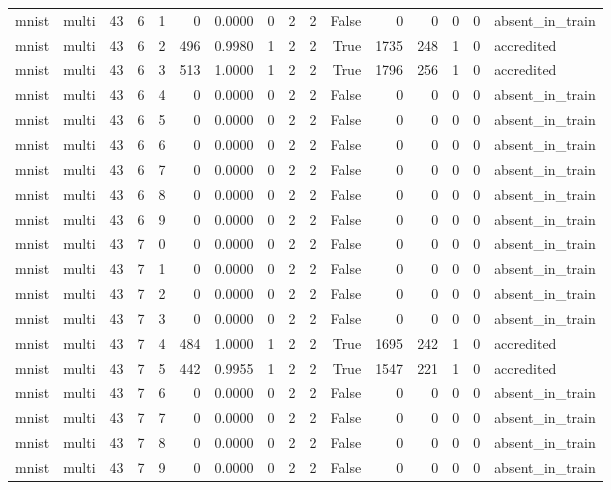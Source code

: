 \begin{tabular}{llrrrrrrrrrrrrrl}
mnist & multi & 43 & 6 & 1 & 0 & 0.0000 & 0 & 2 & 2 & False & 0 & 0 & 0 & 0 & absent\_in\_train \\
mnist & multi & 43 & 6 & 2 & 496 & 0.9980 & 1 & 2 & 2 & True & 1735 & 248 & 1 & 0 & accredited \\
mnist & multi & 43 & 6 & 3 & 513 & 1.0000 & 1 & 2 & 2 & True & 1796 & 256 & 1 & 0 & accredited \\
mnist & multi & 43 & 6 & 4 & 0 & 0.0000 & 0 & 2 & 2 & False & 0 & 0 & 0 & 0 & absent\_in\_train \\
mnist & multi & 43 & 6 & 5 & 0 & 0.0000 & 0 & 2 & 2 & False & 0 & 0 & 0 & 0 & absent\_in\_train \\
mnist & multi & 43 & 6 & 6 & 0 & 0.0000 & 0 & 2 & 2 & False & 0 & 0 & 0 & 0 & absent\_in\_train \\
mnist & multi & 43 & 6 & 7 & 0 & 0.0000 & 0 & 2 & 2 & False & 0 & 0 & 0 & 0 & absent\_in\_train \\
mnist & multi & 43 & 6 & 8 & 0 & 0.0000 & 0 & 2 & 2 & False & 0 & 0 & 0 & 0 & absent\_in\_train \\
mnist & multi & 43 & 6 & 9 & 0 & 0.0000 & 0 & 2 & 2 & False & 0 & 0 & 0 & 0 & absent\_in\_train \\
mnist & multi & 43 & 7 & 0 & 0 & 0.0000 & 0 & 2 & 2 & False & 0 & 0 & 0 & 0 & absent\_in\_train \\
mnist & multi & 43 & 7 & 1 & 0 & 0.0000 & 0 & 2 & 2 & False & 0 & 0 & 0 & 0 & absent\_in\_train \\
mnist & multi & 43 & 7 & 2 & 0 & 0.0000 & 0 & 2 & 2 & False & 0 & 0 & 0 & 0 & absent\_in\_train \\
mnist & multi & 43 & 7 & 3 & 0 & 0.0000 & 0 & 2 & 2 & False & 0 & 0 & 0 & 0 & absent\_in\_train \\
mnist & multi & 43 & 7 & 4 & 484 & 1.0000 & 1 & 2 & 2 & True & 1695 & 242 & 1 & 0 & accredited \\
mnist & multi & 43 & 7 & 5 & 442 & 0.9955 & 1 & 2 & 2 & True & 1547 & 221 & 1 & 0 & accredited \\
mnist & multi & 43 & 7 & 6 & 0 & 0.0000 & 0 & 2 & 2 & False & 0 & 0 & 0 & 0 & absent\_in\_train \\
mnist & multi & 43 & 7 & 7 & 0 & 0.0000 & 0 & 2 & 2 & False & 0 & 0 & 0 & 0 & absent\_in\_train \\
mnist & multi & 43 & 7 & 8 & 0 & 0.0000 & 0 & 2 & 2 & False & 0 & 0 & 0 & 0 & absent\_in\_train \\
mnist & multi & 43 & 7 & 9 & 0 & 0.0000 & 0 & 2 & 2 & False & 0 & 0 & 0 & 0 & absent\_in\_train \\

\end{tabular}
